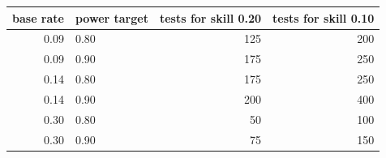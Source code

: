 \begin{tabular}{rlrr}
\toprule
base rate & power target & tests for skill 0.20 & tests for skill 0.10 \\
\midrule
0.09 & 0.80 & 125 & 200 \\
0.09 & 0.90 & 175 & 250 \\
0.14 & 0.80 & 175 & 250 \\
0.14 & 0.90 & 200 & 400 \\
0.30 & 0.80 & 50 & 100 \\
0.30 & 0.90 & 75 & 150 \\
\bottomrule
\end{tabular}
